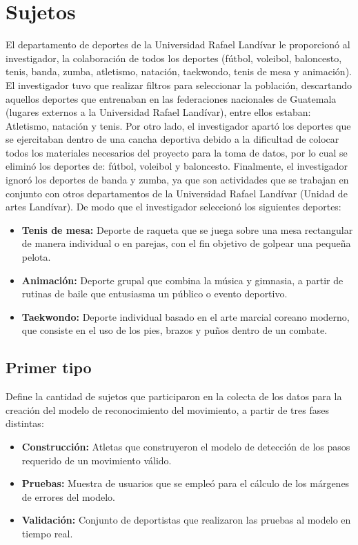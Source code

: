 \section{Sujetos}
El departamento de deportes de la Universidad Rafael Land\'ivar le proporcion\'o al investigador, la colaboraci\'on de todos los deportes (f\'utbol, voleibol, baloncesto, tenis, banda, zumba, atletismo, nataci\'on, taekwondo, tenis de mesa y animaci\'on).
\medbreak
El investigador tuvo que realizar filtros para seleccionar la poblaci\'on, descartando aquellos deportes que entrenaban en las federaciones nacionales de Guatemala (lugares externos a la Universidad Rafael Land\'ivar), entre ellos estaban: Atletismo, nataci\'on y tenis.
\medbreak
Por otro lado, el investigador apart\'o los deportes que se ejercitaban dentro de una cancha deportiva debido a la dificultad de colocar todos los materiales necesarios del proyecto para la toma de datos, por lo cual se elimin\'o los deportes de:  f\'utbol, voleibol y baloncesto.
\medbreak
Finalmente, el investigador ignor\'o los deportes de banda y zumba, ya que son actividades que se trabajan en conjunto con otros departamentos de la Universidad Rafael Land\'ivar (Unidad de artes Land\'ivar). De modo que el investigador seleccion\'o los siguientes deportes:
\begin{itemize}
	\item \textbf{Tenis de mesa:} Deporte de raqueta que se juega sobre una mesa rectangular de manera individual o en parejas, con el fin objetivo de golpear una peque\~na pelota.
	\item \textbf{Animaci\'on:} Deporte grupal que combina la m\'usica y gimnasia, a partir de rutinas de baile que entusiasma un p\'ublico o evento deportivo.
	\item \textbf{Taekwondo:} Deporte individual basado en el arte marcial coreano moderno, que consiste en el uso de los pies, brazos y pu\~nos dentro de un combate.
\end{itemize}
\subsection{Primer tipo} \label{sj:1t}
Define la cantidad de sujetos que participaron en la colecta de los datos para la creaci\'on del modelo de reconocimiento del movimiento, a partir de tres fases distintas:
\begin{itemize}
	\item \textbf{Construcci\'on:} Atletas que construyeron el modelo de detecci\'on de los pasos requerido de un movimiento v\'alido.
	\item \textbf{Pruebas:} Muestra de usuarios que se emple\'o para el c\'alculo de los m\'argenes de  errores del modelo.
	\item \textbf{Validaci\'on:} Conjunto de deportistas que realizaron las pruebas al modelo en tiempo real.
\end{itemize}
